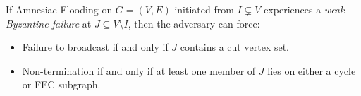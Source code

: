     \begin{*theorem}\label{thm: Byzantine}
        If Amnesiac Flooding on $G=(V,E)$ initiated from $I\subsetneq V$ experiences a \emph{weak Byzantine failure} at $J\subseteq V\setminus I$, then the adversary can force:
        \begin{itemize}
            \item Failure to broadcast if and only if $J$ contains a cut vertex set.
            \item Non-termination if and only if at least one member of $J$ lies on either a cycle or FEC subgraph. 
        \end{itemize}
    \end{*theorem}